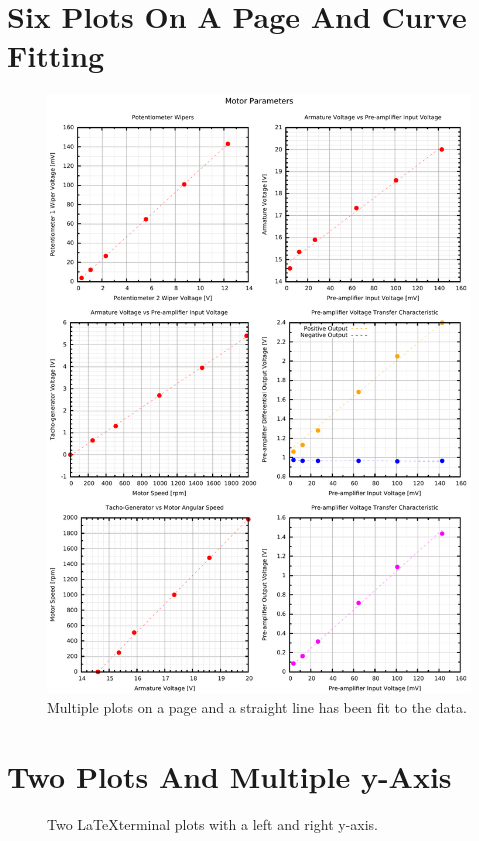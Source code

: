 \documentclass[10pt,a4paper,final]{report}
\begin{document}
\section{Six Plots On A Page And Curve Fitting}
\begin{figure}[!hbtp]
\centering
\includegraphics[width=\textwidth]{../Code/MotorGraphGnuplot/OpenLoopMotorPlots.pdf}
\caption{Multiple plots on a page and a straight line has been fit to the data.}
\end{figure}


\section{Two Plots And Multiple y-Axis}
\begin{figure}[!htbp]
\begin{center}
	\resizebox{\columnwidth}{!}{}
\caption{Two \LaTeX terminal plots with a left and right y-axis.}
\label{fig:11cTRAngle}
\end{center}
\end{figure}

\end{document}
